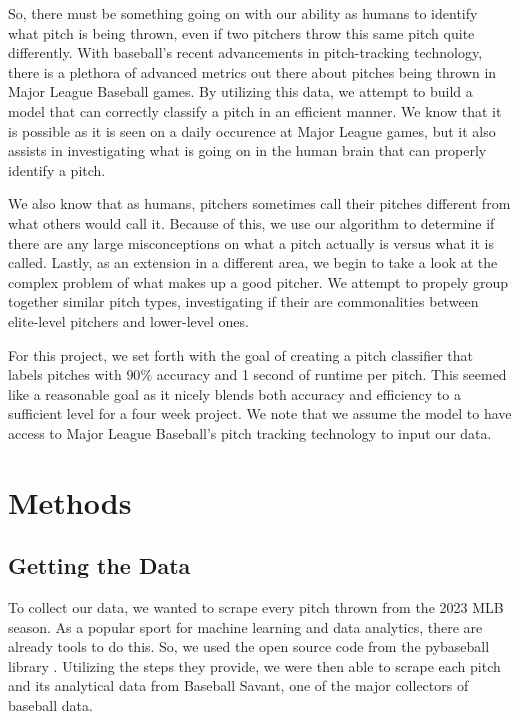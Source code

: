 \documentclass{article}
\begin{document}
So, there must be something going on with our ability as humans to identify what pitch is 
being thrown, even if two pitchers throw this same pitch quite differently. With baseball's 
recent advancements in pitch-tracking technology, there is a plethora of advanced metrics out 
there about pitches being thrown in Major League Baseball games. By utilizing this data, we 
attempt to build a model that can correctly classify a pitch in an efficient manner. 
We know that it is possible as it is seen on a daily occurence at Major League games, but 
it also assists in investigating what is going on in the human brain that can properly 
identify a pitch.

We also know that as humans, pitchers sometimes call their pitches different from 
what others would call it. Because of this, we use our algorithm to determine if there 
are any large misconceptions on what a pitch actually is versus what it is called. Lastly, 
as an extension in a different area, we begin to take a look at the complex problem of 
what makes up a good pitcher. We attempt to propely group together similar pitch types, 
investigating if their are commonalities between elite-level pitchers and lower-level ones. 

For this project, we set forth with the goal of creating a pitch classifier that labels 
pitches with $90\%$ accuracy and 1 second of runtime per pitch. This seemed like a reasonable goal 
as it nicely blends both accuracy and efficiency to a sufficient level for a four week 
project. We note that we assume the model to have access to Major League Baseball's 
pitch tracking technology to input our data.

\section{Methods}
\label{methods}

\subsection{Getting the Data}
\label{data}

To collect our data, we wanted to scrape every pitch thrown from the 2023 MLB season. As 
a popular sport for machine learning and data analytics, there are already tools to do this. 
So, we used the open source code from the pybaseball library \cite{pybaseball}.
Utilizing the steps they provide, we were then able to scrape each pitch and its analytical 
data from Baseball Savant, one of the major collectors of baseball data. 
\end{document}
